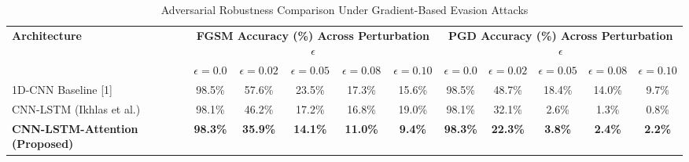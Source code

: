 
\begin{table}[t]
\centering
\caption{Adversarial Robustness Comparison Under Gradient-Based Evasion Attacks}
\label{tab:adversarial_robustness}
\renewcommand{\arraystretch}{1.2}
\begin{tabular}{|l|c|c|c|c|c||c|c|c|c|c|}
\hline
\multirow{2}{*}{\textbf{Architecture}} & \multicolumn{5}{c||}{\textbf{FGSM Accuracy (\%) Across Perturbation $\epsilon$}} & \multicolumn{5}{c|}{\textbf{PGD Accuracy (\%) Across Perturbation $\epsilon$}} \\
\cline{2-11}
 & $\epsilon=0.0$ & $\epsilon=0.02$ & $\epsilon=0.05$ & $\epsilon=0.08$ & $\epsilon=0.10$ & $\epsilon=0.0$ & $\epsilon=0.02$ & $\epsilon=0.05$ & $\epsilon=0.08$ & $\epsilon=0.10$ \\
\hline
1D-CNN Baseline [1] & 98.5\% & 57.6\% & 23.5\% & 17.3\% & 15.6\% & 98.5\% & 48.7\% & 18.4\% & 14.0\% & 9.7\% \\
CNN-LSTM (Ikhlas et al.) & 98.1\% & 46.2\% & 17.2\% & 16.8\% & 19.0\% & 98.1\% & 32.1\% & 2.6\% & 1.3\% & 0.8\% \\
\textbf{CNN-LSTM-Attention (Proposed)} & \textbf{98.3\%} & \textbf{35.9\%} & \textbf{14.1\%} & \textbf{11.0\%} & \textbf{9.4\%} & \textbf{98.3\%} & \textbf{22.3\%} & \textbf{3.8\%} & \textbf{2.4\%} & \textbf{2.2\%} \\
\hline
\end{tabular}
\end{table}
